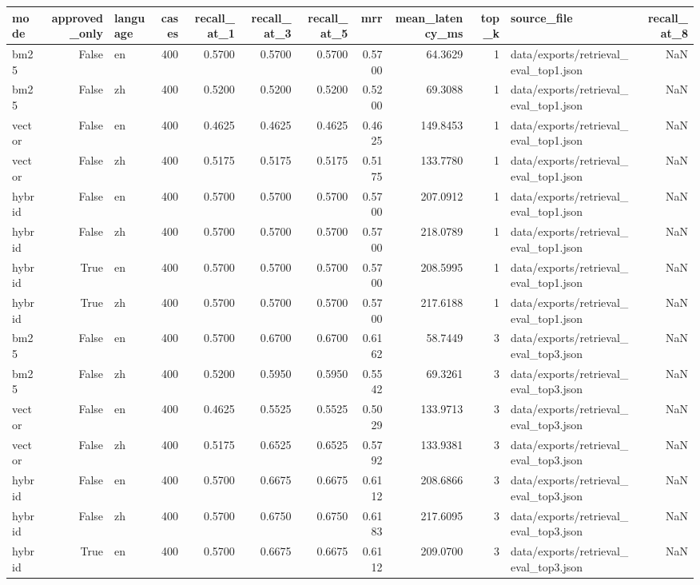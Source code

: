 \begin{tabular}{lrlrrrrrrrlr}
\toprule
mode & approved_only & language & cases & recall_at_1 & recall_at_3 & recall_at_5 & mrr & mean_latency_ms & top_k & source_file & recall_at_8 \\
\midrule
bm25 & False & en & 400 & 0.5700 & 0.5700 & 0.5700 & 0.5700 & 64.3629 & 1 & data/exports/retrieval_eval_top1.json & NaN \\
bm25 & False & zh & 400 & 0.5200 & 0.5200 & 0.5200 & 0.5200 & 69.3088 & 1 & data/exports/retrieval_eval_top1.json & NaN \\
vector & False & en & 400 & 0.4625 & 0.4625 & 0.4625 & 0.4625 & 149.8453 & 1 & data/exports/retrieval_eval_top1.json & NaN \\
vector & False & zh & 400 & 0.5175 & 0.5175 & 0.5175 & 0.5175 & 133.7780 & 1 & data/exports/retrieval_eval_top1.json & NaN \\
hybrid & False & en & 400 & 0.5700 & 0.5700 & 0.5700 & 0.5700 & 207.0912 & 1 & data/exports/retrieval_eval_top1.json & NaN \\
hybrid & False & zh & 400 & 0.5700 & 0.5700 & 0.5700 & 0.5700 & 218.0789 & 1 & data/exports/retrieval_eval_top1.json & NaN \\
hybrid & True & en & 400 & 0.5700 & 0.5700 & 0.5700 & 0.5700 & 208.5995 & 1 & data/exports/retrieval_eval_top1.json & NaN \\
hybrid & True & zh & 400 & 0.5700 & 0.5700 & 0.5700 & 0.5700 & 217.6188 & 1 & data/exports/retrieval_eval_top1.json & NaN \\
bm25 & False & en & 400 & 0.5700 & 0.6700 & 0.6700 & 0.6162 & 58.7449 & 3 & data/exports/retrieval_eval_top3.json & NaN \\
bm25 & False & zh & 400 & 0.5200 & 0.5950 & 0.5950 & 0.5542 & 69.3261 & 3 & data/exports/retrieval_eval_top3.json & NaN \\
vector & False & en & 400 & 0.4625 & 0.5525 & 0.5525 & 0.5029 & 133.9713 & 3 & data/exports/retrieval_eval_top3.json & NaN \\
vector & False & zh & 400 & 0.5175 & 0.6525 & 0.6525 & 0.5792 & 133.9381 & 3 & data/exports/retrieval_eval_top3.json & NaN \\
hybrid & False & en & 400 & 0.5700 & 0.6675 & 0.6675 & 0.6112 & 208.6866 & 3 & data/exports/retrieval_eval_top3.json & NaN \\
hybrid & False & zh & 400 & 0.5700 & 0.6750 & 0.6750 & 0.6183 & 217.6095 & 3 & data/exports/retrieval_eval_top3.json & NaN \\
hybrid & True & en & 400 & 0.5700 & 0.6675 & 0.6675 & 0.6112 & 209.0700 & 3 & data/exports/retrieval_eval_top3.json & NaN \\

\end{tabular}
